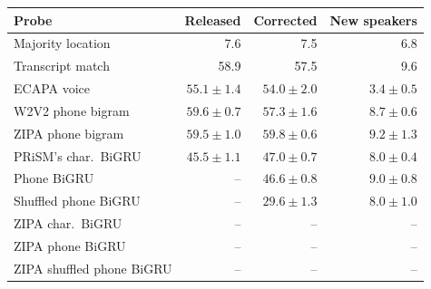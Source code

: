 \begin{tabularx}{\linewidth}{@{}>{\raggedright\arraybackslash}Xrrr@{}}
\toprule
Probe & Released & Corrected & New speakers \\
\midrule
Majority location & 7.6 & 7.5 & 6.8 \\
Transcript match & 58.9 & 57.5 & 9.6 \\
ECAPA voice & $55.1 \pm 1.4$ & $54.0 \pm 2.0$ & $3.4 \pm 0.5$ \\
W2V2 phone bigram & $59.6 \pm 0.7$ & $57.3 \pm 1.6$ & $8.7 \pm 0.6$ \\
ZIPA phone bigram & $59.5 \pm 1.0$ & $59.8 \pm 0.6$ & $9.2 \pm 1.3$ \\
PRiSM's char.\ BiGRU & $45.5 \pm 1.1$ & $47.0 \pm 0.7$ & $8.0 \pm 0.4$ \\
Phone BiGRU & -- & $46.6 \pm 0.8$ & $9.0 \pm 0.8$ \\
Shuffled phone BiGRU & -- & $29.6 \pm 1.3$ & $8.0 \pm 1.0$ \\
ZIPA char.\ BiGRU & -- & -- & -- \\
ZIPA phone BiGRU & -- & -- & -- \\
ZIPA shuffled phone BiGRU & -- & -- & -- \\
\bottomrule
\end{tabularx}
